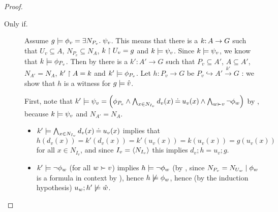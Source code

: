 \begin{proof}
\begin{description}
\smallskip
\item[Only if.] Assume $g\models \phi_v = \exists N_{P_v}.\; \psi_v$. This means that 
there is a $k{:}\, A\rightarrow G$ such that $U_v \subseteq A$, $N_{P_v} \subseteq N_A$, $k\restriction U_v = g$ and $k \models \psi_v$. Since  $k \models \psi_v$, we know that $k \models \phi_{P_v}$. Then by  there is a $k':A' \to G$ such that $P_v {\subseteq} A'$, $A\subseteq A'$, $N_{A'} = N_A$, $k'\restriction A = k$ and $k' \models \phi_{P_v}$. Let $h: P_v \to G$ be $P_v \hookrightarrow A' \stackrel{k'}{\to} G$ : we show that $h$ is a witness for $g \models \hat v$.

First, note that $k'\sat \psi_v = \left( \phi_{P_v}\wedge \bigwedge_{x\in N_{I_v}} d_v(x)\Eq u_v(x) \wedge \bigwedge_{w\childof v} \neg\phi_w \right)$ by , because $k\models \psi_v$ and $N_{A'}=N_A$. 
\begin{itemize}

\item $k'\models \bigwedge_{x\in N_{I_v}} d_v(x)\mathbin{\doteq} u_v(x)$ implies that $h(d_v(x))=k'(d_v(x))=k'(u_v(x))= k(u_v(x)) = g(u_v(x))$ for all $x\in N_{I_v}$, and since $I_v=\langle N_{I_v}\rangle$ this implies $d_v;h=u_v;g$.

\item $k'\models \neg\phi_w$ (for all $w\childof v$) implies $h\models\neg\phi_w$ (by , since ${N_{P_v} = N_{U_w}} \mid {\phi_w}$ is a formula in context by ), hence $h\not\models\phi_w$, hence (by the induction hypothesis) $u_w;h'\not\models \hat w$.

\end{itemize}






\end{description}
\end{proof}

